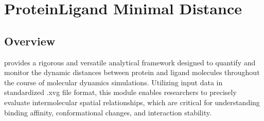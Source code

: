 \documentclass[a4paper,10pt,english]{sphinxmanual}
\begin{document}
\begin{sphinxVerbatim}[commandchars=\\\{\}]
  \PYG{p}{[}\PYG{p}{]}
   
     
            
          

   
      
      
     
\end{sphinxVerbatim}

\sphinxstepscope


\chapter{Protein\sphinxhyphen{}Ligand Minimal Distance}
\label{\detokenize{Distance:protein-ligand-minimal-distance}}\label{\detokenize{Distance::doc}}

\section{Overview}
\label{\detokenize{Distance:overview}}
\sphinxAtStartPar
{} provides a rigorous and versatile analytical framework designed to quantify and monitor the dynamic distances between protein and ligand molecules throughout the course of molecular dynamics simulations. Utilizing input data in standardized .xvg file format, this module enables researchers to precisely evaluate intermolecular spatial relationships, which are critical for understanding binding affinity, conformational changes, and interaction stability.
\end{document}
